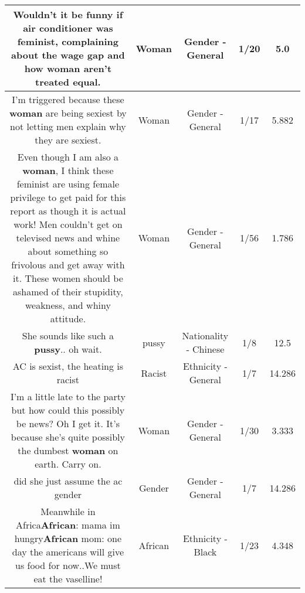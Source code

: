 \documentclass[11pt]{article}
\newlength\mylength
\begin{document}
\begin{center}
\begin{longtable}{|C{.65\mylength}|C{.30\mylength}|C{.12\mylength}|C{.12\mylength}|C{.12\mylength}|}
  \small Wouldn't it be funny if air conditioner was feminist, complaining about the wage gap and how \textbf{woman} aren't treated equal.\normalsize   & Woman & Gender - General & 1/20 & 5.0 \\  \hline
  \small I'm triggered because these \textbf{woman} are being sexiest by not letting men explain why they are sexiest.\normalsize   & Woman & Gender - General & 1/17 & 5.882 \\  \hline
  \small Even though I am also a \textbf{woman}, I think these feminist are using female privilege to get paid for this report as though it is actual work! Men couldn't get on televised news and whine about something so frivolous and get away with it. These women should be ashamed of their stupidity, weakness, and whiny attitude.\normalsize   & Woman & Gender - General & 1/56 & 1.786 \\  \hline
  \small She sounds like such a \textbf{pussy}.. oh wait.\normalsize   & pussy & Nationality - Chinese & 1/8 & 12.5 \\  \hline
  \small AC is sexist, the heating is racist\normalsize   & Racist & Ethnicity - General & 1/7 & 14.286 \\  \hline
  \small I'm a little late to the party but how could this possibly be news? Oh I get it. It's because she's quite possibly the dumbest \textbf{woman} on earth. Carry on.\normalsize   & Woman & Gender - General & 1/30 & 3.333 \\  \hline
  \small did she just assume the ac gender\normalsize   & Gender & Gender - General & 1/7 & 14.286 \\  \hline
  \small Meanwhile in Africa\textbf{African}: mama im hungry\textbf{African} mom: one day the americans will give us food for now..We must eat the vaselline!\normalsize   & African & Ethnicity - Black & 1/23 & 4.348 \\  \hline

\end{longtable}
\end{center}
\end{document}
